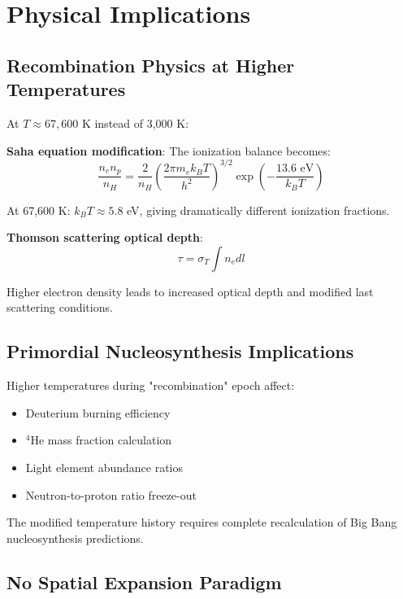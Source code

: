 \documentclass[12pt,a4paper]{article}
\begin{document}
	\section{Physical Implications}
	\label{sec:physical_implications}
	
	\subsection{Recombination Physics at Higher Temperatures}
	\label{subsec:recombination_physics}
	
	At $T \approx 67{,}600$ K instead of 3,000 K:
	
	\textbf{Saha equation modification}: The ionization balance becomes:
	\begin{equation}
		\frac{n_e n_p}{n_H} = \frac{2}{n_H}\left(\frac{2\pi m_e k_B T}{h^2}\right)^{3/2} \exp\left(-\frac{13.6 \text{ eV}}{k_B T}\right)
	\end{equation}
	
	At 67,600 K: $k_B T \approx 5.8$ eV, giving dramatically different ionization fractions.
	
	\textbf{Thomson scattering optical depth}:
	\begin{equation}
		\tau = \sigma_T \int n_e dl
	\end{equation}
	
	Higher electron density leads to increased optical depth and modified last scattering conditions.
	
	\subsection{Primordial Nucleosynthesis Implications}
	\label{subsec:nucleosynthesis}
	
	Higher temperatures during "recombination" epoch affect:
	\begin{itemize}
		\item Deuterium burning efficiency
		\item $^4$He mass fraction calculation
		\item Light element abundance ratios
		\item Neutron-to-proton ratio freeze-out
	\end{itemize}
	
	The modified temperature history requires complete recalculation of Big Bang nucleosynthesis predictions.
	
	\subsection{No Spatial Expansion Paradigm}
	\label{subsec:no_expansion}
	
\end{document}
